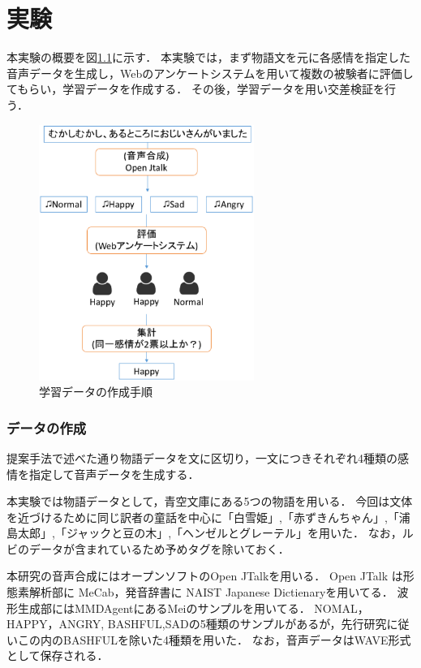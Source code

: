\chapter{実験}

本実験の概要を図\ref{fig:enquete}に示す．
本実験では，まず物語文を元に各感情を指定した音声データを生成し，Webのアンケートシステムを用いて複数の被験者に評価してもらい，学習データを作成する．
その後，学習データを用い交差検証を行う．

\begin{figure}[ht]
  \begin{center}
    \includegraphics[clip,width=7.0cm]{fig/enquete.eps}
    \caption{学習データの作成手順}
    \label{fig:enquete}
  \end{center}
\end{figure}

\subsection{データの作成}
提案手法で述べた通り物語データを文に区切り，一文につきそれぞれ4種類の感情を指定して音声データを生成する．

本実験では物語データとして，青空文庫\cite{aozora}にある5つの物語を用いる．
今回は文体を近づけるために同じ訳者の童話を中心に「白雪姫」,「赤ずきんちゃん」,「浦島太郎」,「ジャックと豆の木」,「ヘンゼルとグレーテル」を用いた．
なお，ルビのデータが含まれているため予めタグを除いておく．

本研究の音声合成にはオープンソフトのOpen JTalk\cite{jtalk}を用いる．
Open JTalk は形態素解析部に MeCab\cite{mecab}，発音辞書に NAIST Japanese Dictienary\cite{naist}を用いてる．
波形生成部にはMMDAgent\cite{mei}にあるMeiのサンプルを用いてる．
NOMAL，HAPPY，ANGRY, BASHFUL,SADの5種類のサンプルがあるが，先行研究に従いこの内のBASHFULを除いた4種類を用いた．
なお，音声データはWAVE形式として保存される．

